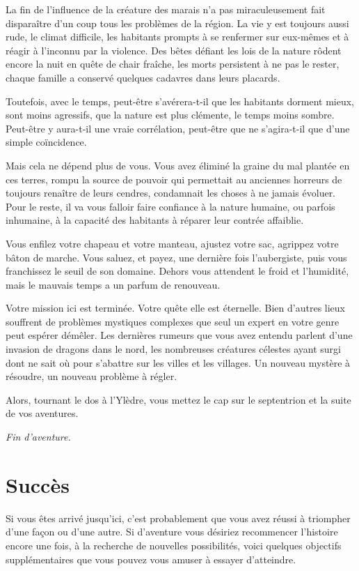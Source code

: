 \documentclass{report}
\newcommand{\theend}{\emph{Fin d'aventure.}}
\begin{document}
La fin de l'influence de la créature des marais n'a pas miraculeusement fait disparaître d'un coup tous les problèmes de la région. La vie y est toujours aussi rude, le climat difficile, les habitants prompts à se renfermer sur eux-mêmes et à réagir à l'inconnu par la violence. Des bêtes défiant les lois de la nature rôdent encore la nuit en quête de chair fraîche, les morts persistent à ne pas le rester, chaque famille a conservé quelques cadavres dans leurs placards. 

Toutefois, avec le temps, peut-être s'avérera-t-il que les habitants dorment mieux, sont moins agressifs, que la nature est plus clémente, le temps moins sombre. Peut-être y aura-t-il une vraie corrélation, peut-être que ne s'agira-t-il que d'une simple coïncidence. 

Mais cela ne dépend plus de vous. Vous avez éliminé la graine du mal plantée en ces terres, rompu la source de pouvoir qui permettait au anciennes horreurs de toujours renaître de leurs cendres, condamnait les choses à ne jamais évoluer. Pour le reste, il va vous falloir faire confiance à la nature humaine, ou parfois inhumaine, à la capacité des habitants à réparer leur contrée affaiblie. 

Vous enfilez votre chapeau et votre manteau, ajustez votre sac, agrippez votre bâton de marche. Vous saluez, et payez, une dernière fois l'aubergiste, puis vous franchissez le seuil de son domaine. Dehors vous attendent le froid et l'humidité, mais le mauvais temps a un parfum de renouveau. 

Votre mission ici est terminée. Votre quête elle est éternelle. Bien d'autres lieux souffrent de problèmes mystiques complexes que seul un expert en votre genre peut espérer démêler. Les dernières rumeurs que vous avez entendu parlent d'une invasion de dragons dans le nord, les nombreuses créatures célestes ayant surgi dont ne sait où pour s'abattre sur les villes et les villages. Un nouveau mystère à résoudre, un nouveau problème à régler. 

Alors, tournant le dos à l'Ylèdre, vous mettez le cap sur le septentrion et la suite de vos aventures.

\theend

\chapter{Succès}

Si vous êtes arrivé jusqu'ici, c'est probablement que vous avez réussi à triompher d'une façon ou d'une autre. Si d'aventure vous désiriez recommencer l'histoire encore une fois, à la recherche de nouvelles possibilités, voici quelques objectifs supplémentaires que vous pouvez vous amuser à essayer d'atteindre.
\end{document}
